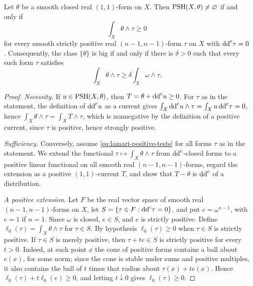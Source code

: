 \begin{lemma}\label{lem:kahler-lamari-criterion}
Let $\theta$ be a smooth closed real $(1,1)$-form on $X$. Then $\mathrm{PSH}(X,\theta)\neq\varnothing$ if and only if
\begin{equation}\label{eq:lamari-positive-tests}
 \int_X\theta\wedge\tau\geq0
\end{equation}
for every smooth strictly positive real $(n-1,n-1)$-form $\tau$ on $X$ with $\mathrm{dd}^{\mathrm{c}}\tau=0$. Consequently, the class $\{\theta\}$ is big if and only if there is $\delta>0$ such that every such form $\tau$ satisfies
\begin{equation}\label{eq:lamari-strict-tests}
 \int_X\theta\wedge\tau\geq\delta\int_X\omega\wedge\tau.
\end{equation}
\end{lemma}
\begin{proof}
\emph{Necessity.} If $u\in\mathrm{PSH}(X,\theta)$, then $T=\theta+\mathrm{dd}^{\mathrm{c}} u\geq0$. For $\tau$ as in the statement, the definition of $\mathrm{dd}^{\mathrm{c}} u$ as a current gives $\int_X\mathrm{dd}^{\mathrm{c}} u\wedge\tau=\int_Xu\,\mathrm{dd}^{\mathrm{c}}\tau=0$, hence $\int_X\theta\wedge\tau=\int_XT\wedge\tau$, which is nonnegative by the definition of a positive current, since $\tau$ is positive, hence strongly positive.

\emph{Sufficiency.} Conversely, assume \eqref{eq:lamari-positive-tests} for all forms $\tau$ as in the statement. We extend the functional $\tau\mapsto\int_X\theta\wedge\tau$ from $\mathrm{dd}^{\mathrm{c}}$-closed forms to a positive linear functional on all smooth real $(n-1,n-1)$-forms, regard the extension as a positive $(1,1)$-current $T$, and show that $T-\theta$ is $\mathrm{dd}^{\mathrm{c}}$ of a distribution.

\emph{A positive extension.} Let $F$ be the real vector space of smooth real $(n-1,n-1)$-forms on $X$, let $S=\{\tau\in F:\mathrm{dd}^{\mathrm{c}}\tau=0\}$, and put $e=\omega^{n-1}$, with $e=1$ if $n=1$. Since $\omega$ is closed, $e\in S$, and $e$ is strictly positive. Define $\ell_0(\tau)=\int_X\theta\wedge\tau$ for $\tau\in S$. By hypothesis $\ell_0(\tau)\geq0$ when $\tau\in S$ is strictly positive. If $\tau\in S$ is merely positive, then $\tau+te\in S$ is strictly positive for every $t>0$. Indeed, at each point $x$ the cone of positive forms contains a ball about $e(x)$, for some norm; since the cone is stable under sums and positive multiples, it also contains the ball of $t$ times that radius about $\tau(x)+te(x)$. Hence $\ell_0(\tau)+t\ell_0(e)\geq0$, and letting $t\downarrow0$ gives $\ell_0(\tau)\geq0$.


\end{proof}
